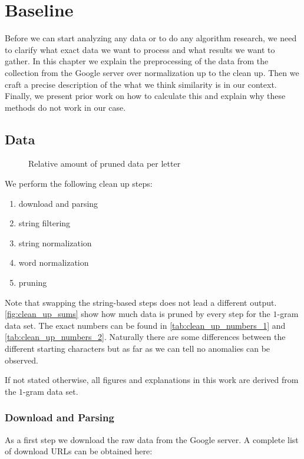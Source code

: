 \chapter{Baseline}
\label{ch:baseline}

Before we can start analyzing any data or to do any algorithm research, we need to clarify what exact data we want to process and what results we want to gather. In this chapter we explain the preprocessing of the data from the collection from the Google server over normalization up to the clean up. Then we craft a precise description of the what we think similarity is in our context. Finally, we present prior work on how to calculate this and explain why these methods do not work in our case.



\section{Data}
\label{sec:baseline:data}

\begin{figure}
    \centering
    
    \caption{Relative amount of pruned data per letter}\label{fig:clean_up_sums}
\end{figure}

We perform the following clean up steps:

\begin{enumerate}
    \itemsep0em
    \item download and parsing
    \item string filtering
    \item string normalization
    \item word normalization
    \item pruning
\end{enumerate}

Note that swapping the string-based steps does not lead a different output. \autoref{fig:clean_up_sums} show how much data is pruned by every step for the $1$-gram data set. The exact numbers can be found in \autoref{tab:clean_up_numbers_1} and \autoref{tab:clean_up_numbers_2}. Naturally there are some differences between the different starting characters but as far as we can tell no anomalies can be observed.

If not stated otherwise, all figures and explanations in this work are derived from the $1$-gram data set.


\subsection{Download and Parsing}
\label{ssec:baseline:data:download}
As a first step we download the raw data from the Google server. A complete list of download URLs can be obtained here:

